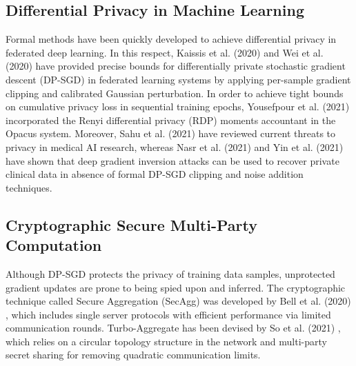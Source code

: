 \documentclass[12pt,a4paper]{report}
\begin{document}
\subsection{Differential Privacy in Machine Learning}
Formal methods have been quickly developed to achieve differential privacy in federated deep learning. In this respect, Kaissis et al. (2020) \cite{kaissis2020secure} and Wei et al. (2020) \cite{wei2020federated} have provided precise bounds for differentially private stochastic gradient descent (DP-SGD) in federated learning systems by applying per-sample gradient clipping and calibrated Gaussian perturbation. In order to achieve tight bounds on cumulative privacy loss in sequential training epochs, Yousefpour et al. (2021) \cite{yousefpour2021opacus} incorporated the Renyi differential privacy (RDP) moments accountant in the Opacus system. Moreover, Sahu et al. (2021) \cite{sahu2021privacy} have reviewed current threats to privacy in medical AI research, whereas Nasr et al. (2021) \cite{nasr2021inference} and Yin et al. (2021) \cite{yin2021see} have shown that deep gradient inversion attacks can be used to recover private clinical data in absence of formal DP-SGD clipping and noise addition techniques.

\subsection{Cryptographic Secure Multi-Party Computation}
Although DP-SGD protects the privacy of training data samples, unprotected gradient updates are prone to being spied upon and inferred. The cryptographic technique called Secure Aggregation (SecAgg) was developed by Bell et al. (2020) \cite{bell2020secure}, which includes single server protocols with efficient performance via limited communication rounds. Turbo-Aggregate has been devised by So et al. (2021) \cite{so2021turbo}, which relies on a circular topology structure in the network and multi-party secret sharing for removing quadratic communication limits.
\end{document}
